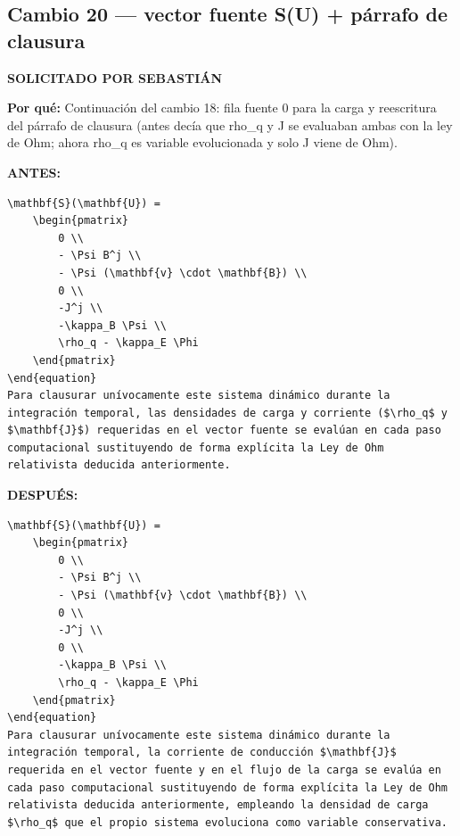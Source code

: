 \documentclass[11pt,a4paper]{article}
\begin{document}
\subsection*{Cambio 20 --- vector fuente S(U) + párrafo de clausura}
\colorbox{usrbg}{\textbf{\footnotesize SOLICITADO POR SEBASTIÁN}}

\textbf{Por qué:} Continuación del cambio 18: fila fuente 0 para la carga y reescritura del párrafo de clausura (antes decía que rho\_q y J se evaluaban ambas con la ley de Ohm; ahora rho\_q es variable evolucionada y solo J viene de Ohm).

\textcolor{antesline}{\textbf{ANTES:}}
\begin{Verbatim}[breaklines=true, breakanywhere=true, fontsize=\small, frame=leftline, rulecolor=\color{antesline}, framerule=1.2pt]
    \mathbf{S}(\mathbf{U}) =
    \begin{pmatrix}
        0 \\
        - \Psi B^j \\
        - \Psi (\mathbf{v} \cdot \mathbf{B}) \\
        0 \\
        -J^j \\
        -\kappa_B \Psi \\
        \rho_q - \kappa_E \Phi
    \end{pmatrix}
\end{equation}
Para clausurar unívocamente este sistema dinámico durante la integración temporal, las densidades de carga y corriente ($\rho_q$ y $\mathbf{J}$) requeridas en el vector fuente se evalúan en cada paso computacional sustituyendo de forma explícita la Ley de Ohm relativista deducida anteriormente.
\end{Verbatim}
\textcolor{despline}{\textbf{DESPUÉS:}}
\begin{Verbatim}[breaklines=true, breakanywhere=true, fontsize=\small, frame=leftline, rulecolor=\color{despline}, framerule=1.2pt]
    \mathbf{S}(\mathbf{U}) =
    \begin{pmatrix}
        0 \\
        - \Psi B^j \\
        - \Psi (\mathbf{v} \cdot \mathbf{B}) \\
        0 \\
        -J^j \\
        0 \\
        -\kappa_B \Psi \\
        \rho_q - \kappa_E \Phi
    \end{pmatrix}
\end{equation}
Para clausurar unívocamente este sistema dinámico durante la integración temporal, la corriente de conducción $\mathbf{J}$ requerida en el vector fuente y en el flujo de la carga se evalúa en cada paso computacional sustituyendo de forma explícita la Ley de Ohm relativista deducida anteriormente, empleando la densidad de carga $\rho_q$ que el propio sistema evoluciona como variable conservativa.
\end{Verbatim}
\end{document}
